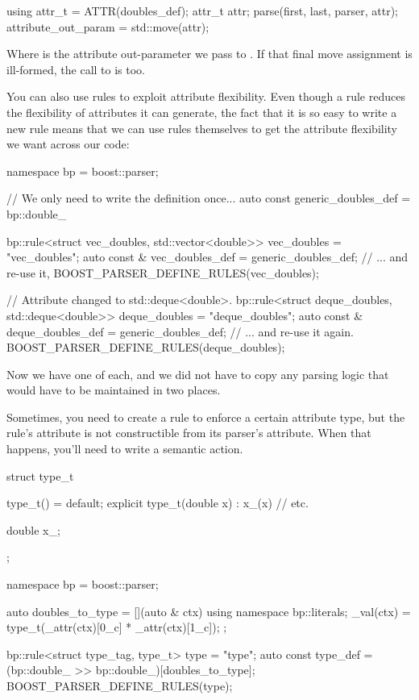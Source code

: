 \documentclass{MyBook}
\begin{document}
\begin{code}
using attr_t = ATTR(doubles_def);
attr_t attr;
parse(first, last, parser, attr);
attribute_out_param = std::move(attr);
\end{code}

Where  is the attribute out-parameter we pass to . If that final move assignment is ill-formed, the call to  is too.

You can also use rules to exploit attribute flexibility. Even though a rule reduces the flexibility of attributes it can generate, the fact that it is so easy to write a new rule means that we can use rules themselves to get the attribute flexibility we want across our code:

\begin{code}
namespace bp = boost::parser;

// We only need to write the definition once...
auto const generic_doubles_def = bp::double_ %

bp::rule<struct vec_doubles, std::vector<double>> vec_doubles = "vec_doubles";
auto const & vec_doubles_def = generic_doubles_def; // ... and re-use it,
BOOST_PARSER_DEFINE_RULES(vec_doubles);

// Attribute changed to std::deque<double>.
bp::rule<struct deque_doubles, std::deque<double>> deque_doubles = "deque_doubles";
auto const & deque_doubles_def = generic_doubles_def; // ... and re-use it again.
BOOST_PARSER_DEFINE_RULES(deque_doubles);
\end{code}

Now we have one of each, and we did not have to copy any parsing logic that would have to be maintained in two places.

Sometimes, you need to create a rule to enforce a certain attribute type, but the rule's attribute is not constructible from its parser's attribute. When that happens, you'll need to write a semantic action.

\begin{code}
struct type_t
{
    type_t() = default;
    explicit type_t(double x) : x_(x) {}
    // etc.

    double x_;
};

namespace bp = boost::parser;

auto doubles_to_type = [](auto & ctx) {
    using namespace bp::literals;
    _val(ctx) = type_t(_attr(ctx)[0_c] * _attr(ctx)[1_c]);
};

bp::rule<struct type_tag, type_t> type = "type";
auto const type_def = (bp::double_ >> bp::double_)[doubles_to_type];
BOOST_PARSER_DEFINE_RULES(type);
\end{code}
\end{document}
